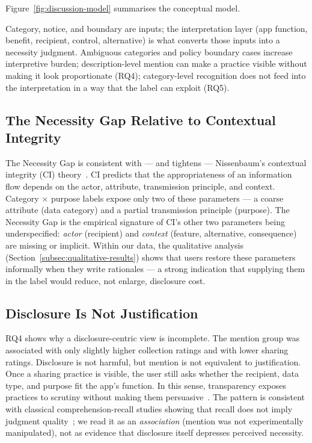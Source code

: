 \documentclass[11pt,a4paper]{article}
\begin{document}
Figure~\ref{fig:discussion-model} summarises the conceptual model.


Category, notice, and boundary are inputs; the interpretation layer
(app function, benefit, recipient, control, alternative) is what
converts those inputs into a necessity judgment. Ambiguous categories
and policy boundary cases increase interpretive burden;
description-level mention can make a practice visible without making
it look proportionate (RQ4); category-level recognition does not feed
into the interpretation in a way that the label can exploit (RQ5).

\subsection{The Necessity Gap Relative to Contextual Integrity}
\label{subsec:ci-position}

The Necessity Gap is consistent with --- and tightens ---
Nissenbaum's contextual integrity (CI)
theory~\citep{nissenbaum:2004,nissenbaum:2010,barth:etal:2006}. CI
predicts that the appropriateness of an information flow depends on
the actor, attribute, transmission principle, and context. Category
$\times$ purpose labels expose only two of these parameters --- a coarse
attribute (data category) and a partial transmission principle
(purpose). The Necessity Gap is the empirical signature of CI's other
two parameters being underspecified: \emph{actor} (recipient) and
\emph{context} (feature, alternative, consequence) are missing or
implicit. Within our data, the qualitative analysis
(Section~\ref{subsec:qualitative-results}) shows that users restore
these parameters informally when they write rationales --- a strong
indication that supplying them in the label would reduce, not enlarge,
disclosure cost.

\subsection{Disclosure Is Not Justification}
\label{subsec:disclosure-not-justification}

RQ4 shows why a disclosure-centric view is incomplete. The mention
group was associated with only slightly higher collection ratings and
with lower sharing ratings. Disclosure is not harmful, but mention is
not equivalent to justification. Once a sharing practice is visible,
the user still asks whether the recipient, data type, and purpose fit
the app's function. In this sense, transparency exposes practices to
scrutiny without making them
persuasive~\citep{solove:2013,acquisti:etal:2017}. The pattern is
consistent with classical comprehension-recall studies showing that
recall does not imply judgment quality~\citep{kelley:etal:2010,
reidenberg:etal:2015}; we read it as an \emph{association} (mention
was not experimentally manipulated), not as evidence that disclosure
itself depresses perceived necessity.
\end{document}
